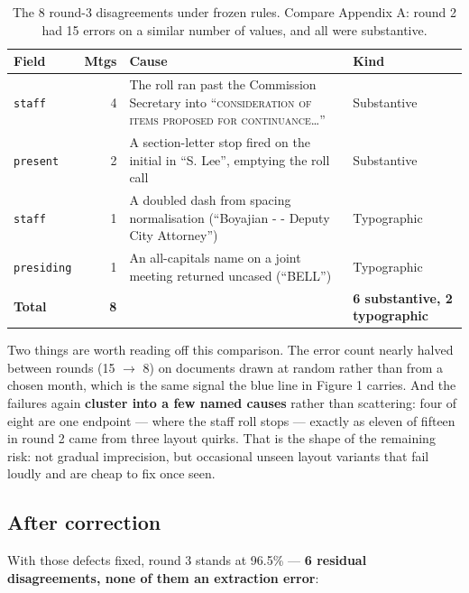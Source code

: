 \documentclass[11pt]{article}
\begin{document}
\begin{table}[h]
\centering
\begin{tabular}{p{}rp{}p{}}
\toprule
Field & Mtgs & Cause & Kind \\
\midrule
\texttt{staff} & 4 & The roll ran past the Commission Secretary into
``\textsc{consideration of items proposed for continuance}\ldots'' & Substantive \\
\texttt{present} & 2 & A section-letter stop fired on the initial in ``S. Lee'',
emptying the roll call & Substantive \\
\texttt{staff} & 1 & A doubled dash from spacing normalisation
(``Boyajian - - Deputy City Attorney'') & Typographic \\
\texttt{presiding} & 1 & An all-capitals name on a joint meeting returned uncased
(``BELL'') & Typographic \\
\midrule
\textbf{Total} & \textbf{8} & & \textbf{6 substantive, 2 typographic} \\
\bottomrule
\end{tabular}
\caption{The 8 round-3 disagreements under frozen rules. Compare Appendix A: round 2 had 15
errors on a similar number of values, and all were substantive.}
\end{table}

\noindent
Two things are worth reading off this comparison. The error count nearly halved between
rounds (15 $\to$ 8) on documents drawn at random rather than from a chosen month, which is
the same signal the blue line in Figure 1 carries. And the failures again \textbf{cluster
into a few named causes} rather than scattering: four of eight are one endpoint --- where
the staff roll stops --- exactly as eleven of fifteen in round 2 came from three layout
quirks. That is the shape of the remaining risk: not gradual imprecision, but occasional
unseen layout variants that fail loudly and are cheap to fix once seen.

\subsection*{After correction}

With those defects fixed, round 3 stands at 96.5\% --- \textbf{6 residual disagreements, none
of them an extraction error}:
\end{document}
